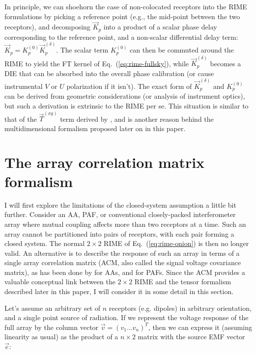 \documentclass[]{aa}
\newcommand{\jones}[2]{\vec {#1}_{#2}}
\begin{document}
In principle, we can shoehorn the case of non-colocated receptors into the RIME formulations by picking a reference point (e.g., the  mid-point between the two receptors), and decomposing $\jones{K}{p}$ into a product of a scalar phase delay corresponding to the reference point, and a non-scalar differential delay term: $\jones{K}{p}=K_p^{(0)}\jones{K}{p}^{(\delta)}.$ The scalar term $K_p^{(0)}$ can then be commuted around the RIME to yield the FT kernel of Eq.~(\ref{eq:rime-fullsky}), while $\jones{K}{p}^{(\delta)}$ becomes a DIE that can be absorbed into the overall phase calibration (or cause instrumental $V$ or $U$ polarization if it isn't). The exact form of $\jones{K}{p}^{(\delta)}$ and $K_p^{(0)}$ can be derived from geometric considerations (or analysis of instrument optics), but such a derivation is extrinsic to the RIME per se. This situation is similar to that of the $\jones{T}{}^{(xy)}$ term derived by \citet{Carozzi:ME3D}, and is another reason behind the multidimensional formalism proposed later on in this paper.

\section{The array correlation matrix formalism}
\label{sec:matrix}

I will first explore the limitations of the closed-system assumption a little bit further. Consider an AA, PAF, or conventional closely-packed interferometer array where mutual coupling affects more than two receptors at a time. Such an array cannot be partitioned into pairs of receptors, with each pair forming a closed system. The normal $2\times2$ RIME of Eq.~(\ref{eq:rime-onion}) is then no longer valid. An alternative is to describe the response of such an array in terms of a single array correlation matrix (ACM, also called the signal voltage covariance matrix), as has been done by \citet{wijnholds-thesis} for AAs, and \citet{warnick-paf-polarimetry} for PAFs. Since the ACM provides a valuable conceptual link between the $2\times2$ RIME and the tensor formalism described later in this paper, I will consider it in some detail in this section.

Let's assume an arbitrary set of $n$ receptors (e.g. dipoles) in arbitrary orientation, and a single point source of radiation. 
If we represent the voltage response of the full array by the column vector $\vec{v}=(v_{1}\ldots v_{n})^T$, then we can express it (assuming linearity as usual) as the product of a $n\times2$ matrix with the source EMF vector $\vec e$:
\end{document}
